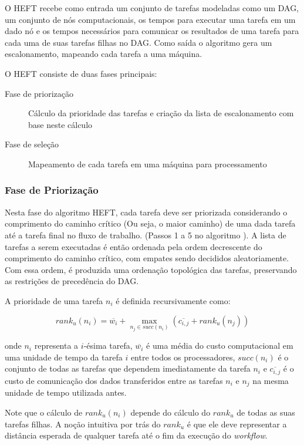 O HEFT recebe como entrada um conjunto de tarefas modeladas como um DAG, um
conjunto de nós computacionais, os tempos para executar uma tarefa em um dado nó
e os tempos necessários para comunicar os resultados de uma tarefa para cada uma
de suas tarefas filhas no DAG. Como saída o algoritmo gera um escalonamento,
mapeando cada tarefa a uma máquina.

O HEFT consiste de duas fases principais:

\begin{description}
	\item[Fase de priorização] Cálculo da prioridade das tarefas e criação
		da lista de escalonamento com base neste cálculo
	\item[Fase de seleção] Mapeamento de cada tarefa em uma máquina para
		processamento
\end{description}

\subsubsection{Fase de Priorização}
Nesta fase do algoritmo HEFT, cada tarefa deve ser priorizada considerando
o comprimento do caminho crítico (Ou seja, o maior caminho) de uma dada tarefa
até a tarefa final no fluxo de trabalho. (Passos 1 a 5 no algoritmo 
). A lista de tarefas a serem
executadas é então ordenada pela ordem decrescente do comprimento do caminho
crítico, com empates sendo decididos aleatoriamente.
Com essa ordem, é produzida uma ordenação topológica das tarefas, 
preservando as restrições de precedência do DAG.

A prioridade de uma tarefa $n_i$ é definida recursivamente como:

$$ \label{eq:rank} rank_u(n_i) = \overline{w_i} + \max_{n_j \in succ(n_i)} (\overline{c_{i,j}} + rank_u(n_j)) $$

onde $n_i$ representa a $i$-ésima tarefa, $\overline{w_i}$ é uma média do custo
computacional em uma unidade de tempo da tarefa $i$ entre todos os
processadores, $succ(n_i)$ é o conjunto de todas as tarefas que dependem
imediatamente da tarefa $n_i$ e $\overline{c_{i,j}}$ é o custo de comunicação
dos dados transferidos entre as tarefas $n_i$ e $n_j$ na mesma unidade de tempo
utilizada antes. %

Note que o cálculo de $rank_u(n_i)$ depende do cálculo do $rank_u$ de todas as
suas tarefas filhas. A noção intuitiva por trás do $rank_u$ é que ele deve
representar a distância esperada de qualquer tarefa até o fim da execução do
\emph{workflow}.

